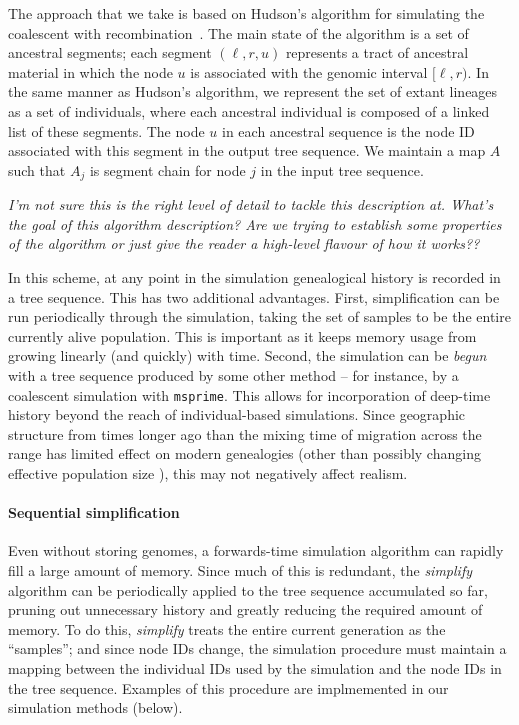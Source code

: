 \documentclass{article}
\newcommand{\msprime}{\texttt{msprime}}
\newcommand{\jk}[1]{{\em \color{red} #1}}
\begin{document}
The approach that we take is based on Hudson's algorithm for simulating
the coalescent with
recombination~\citep{hudson1983properties,kelleher2016efficient}. The main
state of the algorithm is a set of ancestral segments; each segment $(\ell, r,
u)$ represents a tract of ancestral material in which the node $u$ is
associated with the genomic interval $[\ell, r)$. In the same manner
as Hudson's algorithm, we represent the set of extant lineages as a
set of individuals, where each ancestral individual is composed of a
linked list of these segments. The node $u$ in each ancestral sequence
is the node ID associated with this segment in the output tree sequence.
We maintain a map $A$ such that $A_j$ is segment chain for node $j$ in
the input tree sequence.

\jk{I'm not sure this is the right level of detail to tackle this description
at. What's the goal of this algorithm description? Are we trying to
establish some properties of the algorithm or just give the reader a high-level
flavour of how it works??}

In this scheme, at any point in the simulation genealogical history is recorded
in a tree sequence. This has two additional advantages. First, simplification
can be run periodically through the simulation, taking the set of samples to be
the entire currently alive population. This is important as it keeps memory
usage from growing linearly (and quickly) with time. Second, the simulation can
be \emph{begun} with a tree sequence produced by some other method -- for
instance, by a coalescent simulation with \msprime. This allows for
incorporation of deep-time history beyond the reach of individual-based
simulations. Since geographic structure from times longer ago than the mixing
time of migration across the range has limited effect on modern genealogies
\citep{wilkins_separation} (other than possibly changing effective population
size \citet{durretspatial}), this may not negatively affect realism.

\paragraph{Sequential simplification}
Even without storing genomes,
a forwards-time simulation algorithm can rapidly fill a large amount of memory.
Since much of this is redundant, the \emph{simplify} algorithm can be periodically applied
to the tree sequence accumulated so far,
pruning out unnecessary history and greatly reducing the required amount of memory.
To do this, 
\emph{simplify} treats the entire current generation as the ``samples'';
and since node IDs change,
the simulation procedure must maintain a mapping between the individual IDs 
used by the simulation and the node IDs in the tree sequence.
Examples of this procedure are implmemented in our simulation methods (below).
\end{document}
